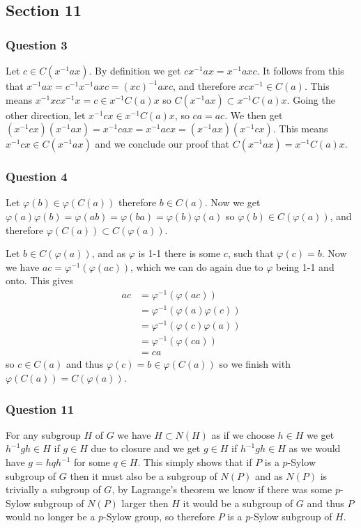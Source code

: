 \documentclass{article}
\begin{document}
\subsection{Section 11}
\subsubsection{Question 3}
Let $ c\in C\left(x^{-1}ax\right)$. By definition we get $cx^{-1}ax=x^{-1}axc$. It follows from this that $x^{-1}ax = c^{-1}x^{-1}axc =(xc)^{-1}axc$, and therefore $xcx^{-1} \in C(a)$. This means $x^{-1}xcx^{-1}x  = c \in x^{-1}C(a)x$ so $C\left(x^{-1}ax\right) \subset x^{-1}C(a)x$. Going the other direction, let $x^{-1}cx \in x^{-1}C(a)x$, so $ca = ac$. We then get $\left(x^{-1}cx\right)\left(x^{-1}ax\right) = x^{-1}cax = x^{-1}acx = \left(x^{-1}ax\right)\left(x^{-1}cx\right)$. This means $x^{-1}cx \in C(x^{-1}ax)$ and we conclude our proof that $C\left(x^{-1}ax\right) = x^{-1}C(a)x$.

\subsubsection{Question 4}
Let $\varphi(b) \in \varphi(C(a))$ therefore $b \in C(a)$. Now we get $\varphi(a)\varphi(b) = \varphi(ab) = \varphi(ba) = \varphi(b)\varphi(a)$ so $\varphi(b) \in C(\varphi(a))$, and therefore $\varphi(C(a)) \subset C(\varphi(a))$.

Let $b \in C(\varphi(a))$, and as $\varphi$ is 1-1 there is some $c$, such that $\varphi(c) = b$. Now we have $ac = \varphi^{-1}(\varphi(ac))$, which we can do again due to $\varphi$ being 1-1 and onto. This gives 
\begin{align*}
ac &= \varphi^{-1}(\varphi(ac))\\
& = \varphi^{-1}(\varphi(a)\varphi(c))\\
& = \varphi^{-1}(\varphi(c)\varphi(a))\\
&= \varphi^{-1}(\varphi(ca)) \\
&= ca
\end{align*}
so $c \in C(a)$ and thus $\varphi(c) = b \in \varphi(C(a))$ so we finish with $\varphi(C(a)) = C(\varphi(a))$.

\subsubsection{Question 11}

For any subgroup $H$ of $G$ we have $H \subset N(H)$ as if we choose $h \in H$ we get $h^{-1}gh \in H$ if $g \in H$ due to closure and we get $g \in H$ if $h^{-1}gh \in H$ as we would have $g = hqh^{-1}$ for some $q\in H$. This simply shows that if $P$ is a $p$-Sylow subgroup of $G$ then it must also be a subgroup of $N(P)$ and as $N(P)$ is trivially a subgroup of $G$, by Lagrange's theorem we know if there was some $p$-Sylow subgroup of $N(P)$ larger then $H$ it would be a subgroup of $G$ and thus $P$ would no longer be a $p$-Sylow group, so therefore $P$ is a $p$-Sylow subgroup of $H$.
\end{document}
